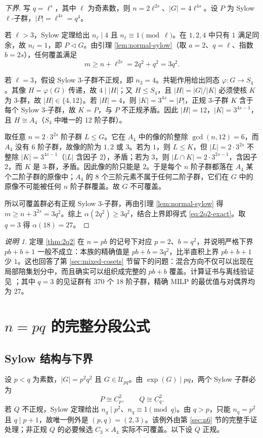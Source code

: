 \documentclass[11pt,a4paper]{article}
\numberwithin{equation}{section}
\theoremstyle{plain}
\theoremstyle{definition}
\theoremstyle{remark}
\newtheorem{remark}[theorem]{说明}
\newcommand{\calU}{\mathcal{U}}
\begin{document}
\begin{proof}[下界]
写 $q=\ell^s$，其中 $\ell$ 为奇素数，则 $n=2\ell^{2s}$、$|G|=4\ell^{4s}$。设 $P$ 为 Sylow $\ell$-子群，$|P|=\ell^{4s}=q^4$。

若 $\ell>3$，Sylow 定理给出 $n_\ell\mid4$ 且 $n_\ell\equiv1\pmod\ell$。在 $1,2,4$ 中只有 $1$ 满足同余，故 $n_\ell=1$，即 $P\triangleleft G$。由引理 \ref{lem:normal-sylow}（取 $a=2$、$q=\ell$、指数 $b=2s$），任何覆盖满足
\[
 m\ge n+\ell^{2s}=2q^2+q^2=3q^2.
\]

若 $\ell=3$，假设 Sylow 3-子群不正规，即 $n_3=4$。共轭作用给出同态 $\varphi:G\to S_4$。其像 $H=\varphi(G)$ 传递，故 $4\mid|H|$；又 $H\le S_4$，且 $|H|=|G|/|K|$ 必须使核 $K$ 为 3-群，故 $|H|\in\{4,12\}$。若 $|H|=4$，则 $|K|=3^{4s}=|P|$，正规 3-子群 $K$ 含于每个 Sylow 3-子群，故 $K=P$，与 $P$ 不正规矛盾。因此 $|H|=12$，$|K|=3^{4s-1}$，且 $H\cong A_4$（$S_4$ 中唯一的 12 阶子群）。

取任意 \(n=2\cdot3^{2s}\) 阶子群 \(L\le G\)。它在 \(A_4\) 中的像的阶整除 \(\gcd(n,12)=6\)，而 \(A_4\) 没有 6 阶子群，故像的阶为 \(1,2\) 或 \(3\)。若为 \(1\)，则 \(L\le K\)，但 \(|L|=2\cdot3^{2s}\) 不整除 \(|K|=3^{4s-1}\)（\(|L|\) 含因子 \(2\)），矛盾；若为 \(3\)，则 \(|L\cap K|=2\cdot3^{2s-1}\)，含因子 \(2\)，而 \(K\) 是 3-群，矛盾。因此像的阶只能是 \(2\)。于是每个 \(n\) 阶子群都落在 \(A_4\) 某个二阶子群的原像中；\(A_4\) 的 8 个三阶元素不属于任何二阶子群，它们在 \(G\) 中的原像不可能被任何 \(n\) 阶子群覆盖。故 \(G\) 不可覆盖。

所以可覆盖群必有正规 Sylow 3-子群，再由引理 \ref{lem:normal-sylow} 得 $m\ge n+3^{2s}=3q^2$。综上 $\alpha(2q^2)\ge3q^2$，结合上界即得式 \eqref{eq:2q2-exact}。取 $q=3$ 得 $\alpha(18)=27$。
\end{proof}

\begin{remark}
定理 \ref{thm:2q2} 在 $n=pb$ 的记号下对应 $p=2$、$b=q^2$，并说明严格下界 $pb+b+1$ 一般不成立：本族的精确值是 $pb+b=3q^2$，比半直积上界 $pb+b+1$ 少 $1$。这也回答了第 \ref{sec:mixed-cosets} 节留下的问题：混合方向不仅可以出现在局部陪集划分中，而且确实可以组织成完整的 $pb+b$ 覆盖。计算证书与离线验证见 ；其中 $q=3$ 的见证群有 370 个 18 阶子群，精确 MILP 的最优值与对偶界均为 $27$。
\end{remark}

\section{\texorpdfstring{$n=pq$}{n=pq} 的完整分段公式}
\subsection{Sylow 结构与下界}\label{sec:pq-lower}
设 $p<q$ 为素数，$|G|=p^2q^2$ 且 $G\in\calU_{pq}$。由 $\exp(G)\mid pq$，两个 Sylow 子群必为
\begin{equation}
 P\cong C_p^2,\qquad Q\cong C_q^2.
\end{equation}
若 $Q$ 不正规，Sylow 定理给出 $n_q\mid p^2$、$n_q\equiv1\pmod q$。由 $q>p$，只能 $n_q=p^2$ 且 $q\mid p+1$，故唯一例外是 $(p,q)=(2,3)$。该例外由第 \ref{sec:n6} 节的完整手证处理；非正规 $Q$ 的必要候选 $C_3\times A_4$ 实际不可覆盖。以下设 $Q$ 正规。
\end{document}
